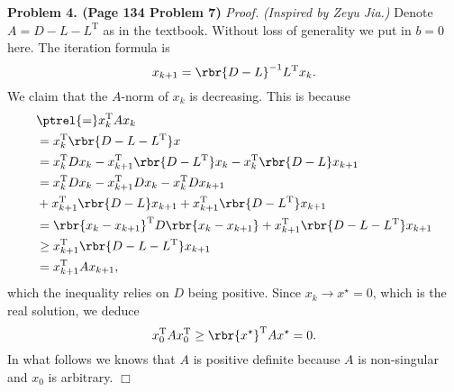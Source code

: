 \documentclass[english, nochinese]{pnote}
\begin{document}
\textbf{Problem 4. (Page 134 Problem 7)} \textit{Proof.} \textit{(Inspired by Zeyu Jia.)} Denote $ A = D - L - L^{\text{T}} $ as in the textbook. Without loss of generality we put in $ b = 0 $ here. The iteration formula is
\begin{equation}
x_{ k + 1 } = \rbr{ D - L }^{-1} L^{\text{T}} x_k.
\end{equation}
We claim that the $A$-norm of $x_k$ is decreasing. This is because
\begin{equation}
\begin{split}
&\ptrel{=} x_k^{\text{T}} A x_k \\
&= x_k^{\text{T}} \rbr{ D - L - L^{\text{T}} } x \\
&= x_k^{\text{T}} D x_k - x_{ k + 1 }^{\text{T}} \rbr{ D - L^{\text{T}} } x_k - x_k^{\text{T}} \rbr{ D - L } x_{ k + 1 } \\
&= x_k^{\text{T}} D x_k - x_{ k + 1 }^{\text{T}} D x_k - x_k^{\text{T}} D x_{ k + 1 } \\
&+ x_{ k + 1 }^{\text{T}} \rbr{ D - L } x_{ k + 1 } + x_{ k + 1 }^{\text{T}} \rbr{ D - L^{\text{T}} } x_{ k + 1 } \\
&= \rbr{ x_k - x_{ k + 1 } }^{\text{T}} D \rbr{ x_k - x_{ k + 1 } } + x_{ k + 1 }^{\text{T}} \rbr{ D - L - L^{\text{T}} } x_{ k + 1 } \\
&\ge x_{ k + 1 }^{\text{T}} \rbr{ D - L - L^{\text{T}} } x_{ k + 1 } \\
&= x_{ k + 1 }^{\text{T}} A x_{ k + 1 },
\end{split}
\end{equation}
which the inequality relies on $D$ being positive. Since $ x_k \rightarrow x^{\star} = 0 $, which is the real solution, we deduce
\begin{equation}
x_0^{\text{T}} A x_0^{\text{T}} \ge \rbr{x^{\star}}^{\text{T}} A x^{\star} = 0.
\end{equation}
In what follows we knows that $A$ is positive definite because $A$ is non-singular and $x_0$ is arbitrary.
\hfill$\Box$
\end{document}
